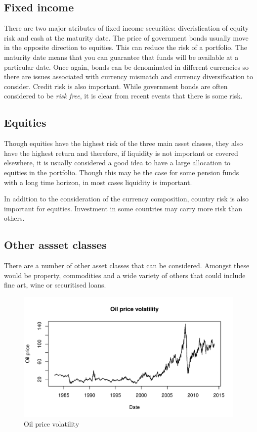 \documentclass[12pt, a4paper, oneside]{article}\usepackage{graphicx, color}
\makeatletter
\def\maxwidth{ %
  \ifdim\Gin@nat@width>\linewidth
    \linewidth
  \else
    \Gin@nat@width
  \fi
}
\newenvironment{knitrout}{}{} %
\makeatother
\begin{document}
\subsection{Fixed income}
There are two major atributes of fixed income securities:  diverisfication of equity risk and cash at the maturity date. The price of government bonds usually move in the opposite direction to equities.  This can reduce the risk of a portfolio.  The maturity date means that you can guarantee that funds will be available at a particular date.  Once again, bonds can be denominated in different currencies so there are issues associated with currency mismatch and currency diversification to consider.  Credit risk is also important.  While government bonds are often considered to be \emph{risk free}, it is clear from recent events that there is some risk. 

\subsection{Equities}
Though equities have the highest risk of the three main asset classes, they also have the highest return and therefore, if liquidity is not important or covered elsewhere, it is usually considered a good idea to have a large allocation to equities in the portfolio.  Though this may be the case for some pension funds with a long time horizon, in most cases liquidity is important.  

In addition to the consideration of the currency composition, country risk is also important for equities.  Investment in some countries may carry more risk than others.  

\subsection{Other assset classes}
There are a number of other asset classes that can be considered.  Amongst these would be property, commodities and a wide variety of others that could include fine art, wine or securitised loans.    
\begin{knitrout}
\color{fgcolor}\begin{figure}[]

\includegraphics[width=\maxwidth]{figure/oil} \caption[Oil price volatility]{Oil price volatility\label{fig:oil}}
\end{figure}


\end{knitrout}
\end{document}
